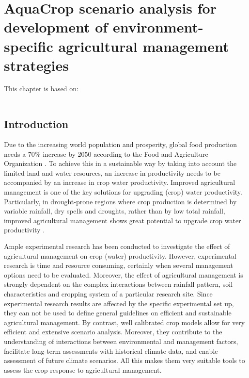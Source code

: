 \chapter{AquaCrop scenario analysis for development of environment-specific agricultural management strategies}\label{ch:aquacropscen}


This chapter is based on:\\
\\[6pt]

\section{Introduction}
Due to the increasing world population and prosperity, global food production needs a 70\% increase by 2050 according to the Food and Agriculture Organization \parencite{fao2009a}. To achieve this in a sustainable way by taking into account the limited land and water resources, an increase in productivity needs to be accompanied by an increase in crop water productivity. Improved agricultural management is one of the key solutions for upgrading (crop) water productivity. Particularly, in drought-prone regions where crop production is determined by variable rainfall, dry spells and droughts, rather than by low total rainfall, improved agricultural management shows great potential to upgrade crop water productivity \parencite{rockstrom2003, wani2008a}.

Ample experimental research has been conducted to investigate the effect of agricultural management on crop (water) productivity. However, experimental research is time and resource consuming, certainly when several management options need to be evaluated. Moreover, the effect of agricultural management is strongly dependent on the complex interactions between rainfall pattern, soil characteristics and cropping system of a particular research site. Since experimental research results are affected by the specific experimental set up, they can not be used to define general guidelines on efficient and sustainable agricultural management. By contrast, well calibrated crop models allow for very efficient and extensive scenario analysis. Moreover, they contribute to the understanding of interactions between environmental and management factors, facilitate long-term assessments with historical climate data, and enable assessment of future climate scenarios. All this makes them very suitable tools to assess the crop response to agricultural management. 

